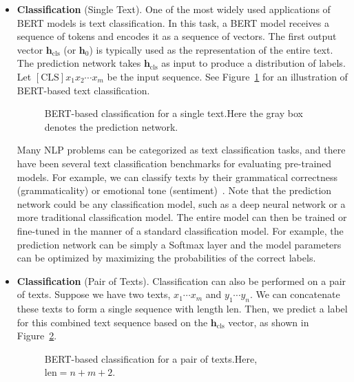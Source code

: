 \begin{itemize}
\item \vspace{0.5em} \textbf{Classification} (Single Text). One of the most widely used applications of BERT models is text classification. In this task, a BERT model receives a sequence of tokens and encodes it as a sequence of vectors. The first output vector $\mathbf{h}_{\mathrm{cls}}$ (or $\mathbf{h}_{0}$) is typically used as the representation of the entire text. The prediction network takes $\mathbf{h}_{\mathrm{cls}}$ as input to produce a distribution of labels. Let $\mathrm{[CLS]}x_1 x_2 \cdots x_m$ be the input sequence. See Figure~\ref{fig:bert-app-classification-single-text} for an illustration of BERT-based text classification.

\begin{figure}[!ht]
\centering

\caption{BERT-based classification for a single text.Here the gray box denotes the prediction network. }
\label{fig:bert-app-classification-single-text}
\end{figure}

    \noindent Many NLP problems can be categorized as text classification tasks, and there have been several text classification benchmarks for evaluating pre-trained models. For example, we can classify texts by their grammatical correctness (grammaticality) or emotional tone (sentiment)~\cite{socher-etal:2013recursive,warstadt-etal:2019neural}. Note that the prediction network could be any classification model, such as a deep neural network or a more traditional classification model. The entire model can then be trained or fine-tuned in the manner of a standard classification model. For example, the prediction network can be simply a Softmax layer and the model parameters can be optimized by maximizing the probabilities of the correct labels.

\item \vspace{0.3em} \textbf{Classification} (Pair of Texts). Classification can also be performed on a pair of texts. Suppose we have two texts, $x_1 \cdots x_m$ and $y_1 \cdots y_n$. We can concatenate these texts to form a single sequence with length $\mathrm{len}$. Then, we predict a label for this combined text sequence based on the $\mathbf{h}_{\mathrm{cls}}$ vector, as shown in Figure~\ref{fig:bert-app-classification-two-texts}.

\begin{figure}[!ht]
\centering

\caption{BERT-based classification for a pair of texts.Here, $\mathrm{len} = n + m + 2$.}
\label{fig:bert-app-classification-two-texts}
\end{figure}


\end{itemize}
